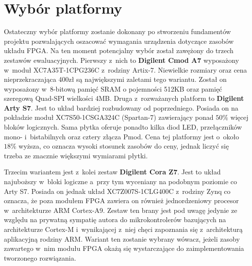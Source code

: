 
\section{Wybór platformy}

Ostateczny wybór platformy zostanie dokonany po stworzeniu fundamentów projektu pozwalających oszacować wymagania urządzenia dotyczące zasobów układu FPGA. Na ten moment potencjalny wybór został zawężony do trzech zestawów ewaluacyjnych. Pierwszy z~nich to \textbf{Digilent Cmod A7} wyposażony w~moduł XC7A35T-1CPG236C z~rodziny Artix-7. Niewielkie rozmiary oraz cena nieprzekraczająca 400zł są największymi zaletami tego wariantu. Został on wyposażony w~8-bitową pamięć SRAM o pojemności 512KB oraz pamięć szeregową Quad-SPI wielkości 4MB. Druga z~rozważanych platform to \textbf{Digilent Arty S7}. Jest to układ bardziej rozbudowany od poprzedniego. Posiada on na pokładzie moduł XC7S50-1CSGA324C (Spartan-7) zawierający ponad $50\%$ więcej bloków logicznych. Sama płytka oferuje ponadto kilka diod LED, przełączników mono- i~bistabilnych oraz cztery złącza Pmod. Cena tej platformy jest o~około $18\%$ wyższa, co oznacza wysoki stosunek zasobów do ceny, jednak liczyć się trzeba ze znacznie większymi wymiarami płytki.

Trzecim wariantem jest z~kolei zestaw \textbf{Digilent Cora Z7}. Jest to układ najuboższy w~bloki logiczne a~przy tym wyceniany na podobnym poziomie co Arty S7. Posiada on jednak układ XC7Z007S-1CLG400C z~rodziny Zynq co oznacza, że poza modułem FPGA zawiera on również jednordzeniowy procesor w~architekturze ARM Cortex-A9. Zestaw ten brany jest pod uwagę jedynie ze względu na prywatną sympatię autora do mikrokontrolerów bazujących na architekturze Cortex-M i~wynikającej z~niej chęci zapoznania się z~architekturą aplikacyjną rodziny ARM. Wariant ten zostanie wybrany wówacz, jeżeli zasoby zawartego w~nim modułu FPGA okażą się wystarczające do zaimplementowania tworzonego rozwiązania.
